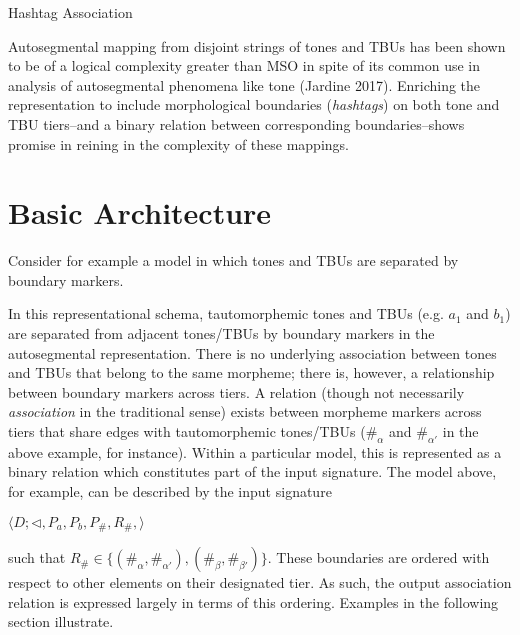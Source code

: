 \documentclass{article}
\begin{document}
\begin{center}
\Large{Hashtag Association}
\end{center} 
\vspace{.3cm} 
\par \indent
Autosegmental mapping from disjoint strings of tones and TBUs has been shown to be of a logical complexity greater than MSO in spite of its common use in analysis of autosegmental phenomena like tone (Jardine 2017). Enriching the representation to include morphological boundaries (\textit{hashtags}) on both tone and TBU tiers--and a binary relation between 
corresponding boundaries--shows promise in reining in the complexity of these mappings.
\section{Basic Architecture}
Consider for example a model in which tones and TBUs are separated by boundary markers.\\
\begin{center}
\end{center}
In this representational schema, tautomorphemic tones and TBUs (e.g. $a_1$ and $b_1$) are separated from adjacent tones/TBUs by boundary markers in the autosegmental representation. There is no underlying association between tones and TBUs that belong to the same morpheme; there is, however, a relationship between boundary markers across tiers. A relation (though not necessarily \textit{association} in the traditional sense) exists between morpheme markers across tiers that share edges with tautomorphemic tones/TBUs ($\#_{\alpha}$ and $\#_{\alpha '}$ in the above example, for instance). Within a particular model, this is represented as a binary relation which constitutes part of the input signature. The model above, for example, can be described by the input signature
\smallskip{}
\begin{center}
$\langle D; \triangleleft, P_{a}, P_{b}, P_{\#}, R_{\#}, \rangle$
\end{center}
such that $R_{\#} \in  \{ (\#_{\alpha}, \#_{\alpha '}), (\#_{\beta}, \#_{\beta '}) \}$. These boundaries are ordered with respect to other elements on their designated tier. As such, the output association relation is expressed largely in terms of this ordering. Examples in the following section illustrate.
\end{document}
